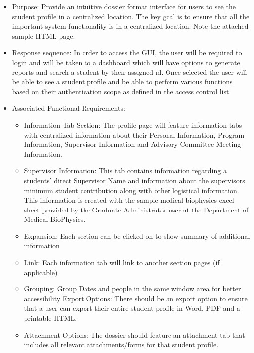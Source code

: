 \documentclass[11pt,a4paper]{report}
\begin{document}
\begin{itemize}
\item Purpose: Provide an intuitive dossier format interface for users to see the student profile in a centralized location. The key goal is to ensure that all the important system functionality is in a centralized location. Note the attached sample HTML page.
\item Response sequence: In order to access the GUI, the user will be required to login and will be taken to a dashboard which will have options to generate reports and search a student by their assigned id. Once selected the user will be able to see a student profile and be able to perform various functions based on their authentication scope as defined in the access control list.
\item Associated Functional Requirements:
\begin{itemize}
\item Information Tab Section: The profile page will feature information tabs with centralized information about their Personal Information, Program Information, Supervisor Information and Advisory Committee Meeting Information. 
\item Supervisor Information: This tab contains information regarding a students' direct Supervisor Name and information about the supervisors minimum student contribution along with other logistical information. This information is created with the sample medical biophysics excel sheet provided by the Graduate Administrator user at the Department of Medical BioPhysics.	

\item Expansion: Each section can be clicked on to show summary of additional information
\item Link:  Each information tab will link to another section pages (if applicable)
\item Grouping: Group Dates and people in the same window area for better accessibility
Export Options: There should be an export option to ensure that a user can export their entire student profile in Word, PDF and a printable HTML.
\item Attachment Options: The dossier should feature an attachment tab that includes all relevant attachments/forms for that student profile.
\end{itemize}
\end{itemize}
\end{document}
